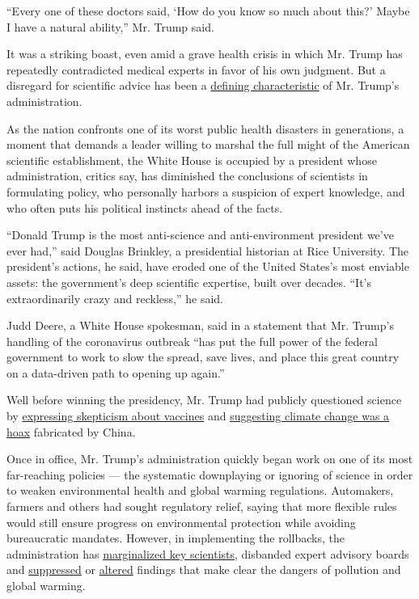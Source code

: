 ``Every one of these doctors said, `How do you know so much about this?'
Maybe I have a natural ability,'' Mr. Trump said.

It was a striking boast, even amid a grave health crisis in which Mr.
Trump has repeatedly contradicted medical experts in favor of his own
judgment. But a disregard for scientific advice has been a
\href{https://www.nytimes3xbfgragh.onion/2019/12/28/climate/trump-administration-war-on-science.html}{defining
characteristic} of Mr. Trump's administration.

As the nation confronts one of its worst public health disasters in
generations, a moment that demands a leader willing to marshal the full
might of the American scientific establishment, the White House is
occupied by a president whose administration, critics say, has
diminished the conclusions of scientists in formulating policy, who
personally harbors a suspicion of expert knowledge, and who often puts
his political instincts ahead of the facts.

``Donald Trump is the most anti-science and anti-environment president
we've ever had,'' said Douglas Brinkley, a presidential historian at
Rice University. The president's actions, he said, have eroded one of
the United States's most enviable assets: the government's deep
scientific expertise, built over decades. ``It's extraordinarily crazy
and reckless,'' he said.

Judd Deere, a White House spokesman, said in a statement that Mr.
Trump's handling of the coronavirus outbreak ``has put the full power of
the federal government to work to slow the spread, save lives, and place
this great country on a data-driven path to opening up again.''

Well before winning the presidency, Mr. Trump had publicly questioned
science by
\href{https://www.nytimes3xbfgragh.onion/2020/03/09/health/trump-vaccines.html}{expressing
skepticism about vaccines} and
\href{https://www.politifact.com/factchecks/2016/jun/03/hillary-clinton/yes-donald-trump-did-call-climate-change-chinese-h/}{suggesting
climate change was a hoax} fabricated by China.

Once in office, Mr. Trump's administration quickly began work on one of
its most far-reaching policies --- the systematic downplaying or
ignoring of science in order to weaken environmental health and global
warming regulations. Automakers, farmers and others had sought
regulatory relief, saying that more flexible rules would still ensure
progress on environmental protection while avoiding bureaucratic
mandates. However, in implementing the rollbacks, the administration has
\href{https://www.nytimes3xbfgragh.onion/2018/06/09/climate/trump-administration-science.html}{marginalized
key scientists}, disbanded expert advisory boards and
\href{https://www.nytimes3xbfgragh.onion/2019/06/08/climate/rod-schoonover-testimony.html}{suppressed}
or
\href{https://www.nytimes3xbfgragh.onion/2020/03/02/climate/goks-uncertainty-language-interior.html}{altered}
findings that make clear the dangers of pollution and global warming.


